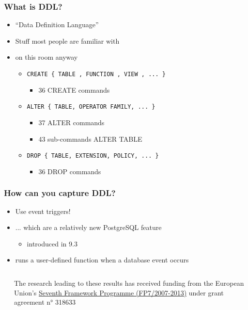 \frame
{ \frametitle{What is DDL?}

\begin{itemize}
\item ``Data Definition Language''
\item Stuff most people are familiar with
\item<2-> on this room anyway
\begin{itemize}
\item \texttt{CREATE \{ TABLE , FUNCTION , VIEW , ... \} }
\begin{itemize} \item 36 CREATE commands \end{itemize}
\item \texttt{ALTER \{ TABLE, OPERATOR FAMILY, ... \} }
\begin{itemize} \item 37 ALTER commands \item  43 sub-commands ALTER TABLE \end{itemize}
\item \texttt{DROP \{ TABLE, EXTENSION, POLICY, ... \} }
\begin{itemize} \item 36 DROP commands \end{itemize}
\end{itemize}
\end{itemize}
}

\frame
{ \frametitle{How can you capture DDL?}

\begin{itemize}
\item  Use event triggers!
\item  ... which are a relatively new PostgreSQL feature
\begin{itemize} \item introduced in 9.3 \end{itemize}
\item  runs a user-defined function when a database event occurs
\end{itemize}

\vfill

\begin{columns}
\color{gray}
\begin{column}{0.3\textwidth}
\end{column}
\begin{column}{0.7\textwidth}
\raggedleft \footnotesize
The research leading to these results has received funding from the European Union's \href{http://ec.europa.eu/research/fp7/index_en.cfm}{\underline{Seventh Framework Programme (FP7/2007-2013)}} under grant agreement n° 318633
\end{column}
\end{columns}


}

